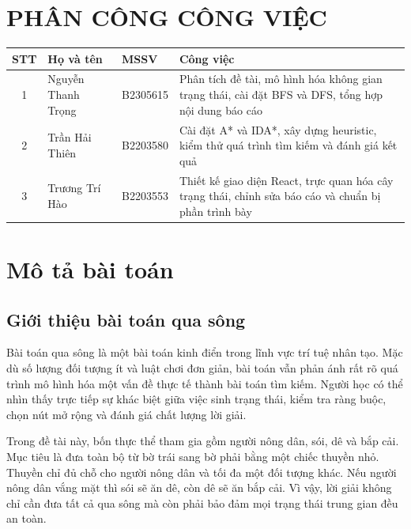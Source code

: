 \documentclass[a4paper,12pt]{article}
\begin{document}
\newpage
\tableofcontents
\newpage

\section*{PHÂN CÔNG CÔNG VIỆC}

\begin{table}[H]
\centering
\begin{tabular}{@{}cllp{7.5cm}@{}}
\toprule
\textbf{STT} & \textbf{Họ và tên} & \textbf{MSSV} & \textbf{Công việc} \\
\midrule
1 & Nguyễn Thanh Trọng & B2305615 & Phân tích đề tài, mô hình hóa không gian trạng thái, cài đặt BFS và DFS, tổng hợp nội dung báo cáo \\
2 & Trần Hải Thiên & B2203580 & Cài đặt A* và IDA*, xây dựng heuristic, kiểm thử quá trình tìm kiếm và đánh giá kết quả \\
3 & Trương Trí Hào & B2203553 & Thiết kế giao diện React, trực quan hóa cây trạng thái, chỉnh sửa báo cáo và chuẩn bị phần trình bày \\
\bottomrule
\end{tabular}
\end{table}

\section{Mô tả bài toán}

\subsection{Giới thiệu bài toán qua sông}

Bài toán qua sông là một bài toán kinh điển trong lĩnh vực trí tuệ nhân tạo. Mặc dù số lượng đối tượng ít và luật chơi đơn giản, bài toán vẫn phản ánh rất rõ quá trình mô hình hóa một vấn đề thực tế thành bài toán tìm kiếm. Người học có thể nhìn thấy trực tiếp sự khác biệt giữa việc sinh trạng thái, kiểm tra ràng buộc, chọn nút mở rộng và đánh giá chất lượng lời giải.

Trong đề tài này, bốn thực thể tham gia gồm người nông dân, sói, dê và bắp cải. Mục tiêu là đưa toàn bộ từ bờ trái sang bờ phải bằng một chiếc thuyền nhỏ. Thuyền chỉ đủ chỗ cho người nông dân và tối đa một đối tượng khác. Nếu người nông dân vắng mặt thì sói sẽ ăn dê, còn dê sẽ ăn bắp cải. Vì vậy, lời giải không chỉ cần đưa tất cả qua sông mà còn phải bảo đảm mọi trạng thái trung gian đều an toàn.
\end{document}
